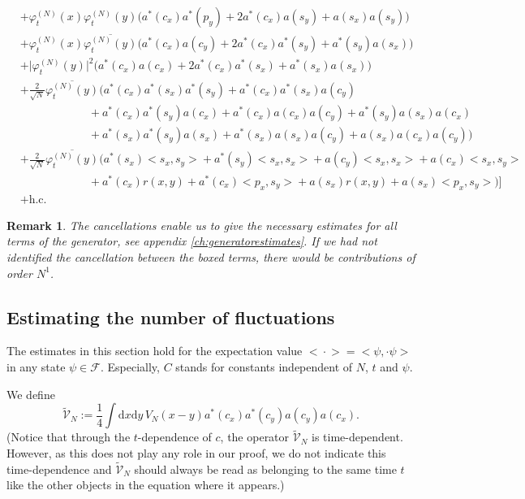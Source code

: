 \documentclass[11pt,a4paper,draft,DIV11]{scrartcl}	%
\newtheorem*{rem}{Remark}
\newcommand{\fock}{\mathcal{F}}		%
\newcommand{\di}{\textrm{d}}		%
\newcommand{\tilV}{\tilde{\mathcal{V}}_N}		%
\newcommand{\hc}{\mbox{h.c.}}		%
\newcommand{\scal}[2]{\big<#1,#2\big>} %
\newcommand{\cc}[1]{\overline{#1}}	%
\newcommand{\ev}[1]{\big<#1\big>}	%
\newcommand{\ph}{\varphi_t^{(N)}}	%
\newcommand{\bd}{\begin{displaymath}}			%
\newcommand{\ed}{\end{displaymath}}
\begin{document}
\begin{align}
& + \ph(x)\ph(y) \Big( a^*(c_x) a^*(p_y) + 2 a^*(c_x) a(s_y) +a(s_x) a(s_y) \Big) \label{l18}\\
& + \ph(x) \cc{\ph(y)} \Big( a^*(c_x) a(c_y) + 2 a^*(c_x) a^*(s_y) + a^*(s_y) a(s_x) \Big) \label{l19}\\
& + \lvert \ph(y) \rvert^2 \Big( a^*(c_x) a(c_x) + 2 a^*(c_x) a^*(s_x) + a^*(s_x) a(s_x) \Big) \label{l20}\\
& + \frac{2}{\sqrt{N}}\cc{\ph(y)} \bigg(    a^*(c_x) a^*(s_x) a^*(s_y) + a^*(c_x) a^*(s_x) a(c_y) \label{l21}\\
					    & \qquad\qquad\qquad + a^*(c_x) a^*(s_y) a(c_x) + a^*(c_x) a(c_x) a(c_y) + a^*(s_y) a(s_x) a(c_x) \label{l22}\\
					    & \qquad\qquad\qquad + a^*(s_x) a^*(s_y) a(s_x) + a^*(s_x) a(s_x) a(c_y) + a(s_x) a(c_x) a(c_y)  \bigg) \label{l23}\\
& + \frac{2}{\sqrt{N}}\cc{\ph(y)} \bigg(    a^*(s_x) \scal{s_x}{s_y} + a^*(s_y) \scal{s_x}{s_x}  + a(c_y) \scal{s_x}{s_x} + 							a(c_x) \scal{s_x}{s_y} \label{l24}\\
					    & \qquad\qquad\qquad + a^*(c_x)r(x,y) + a^*(c_x)\scal{p_x}{s_y} + a(s_x)r(x,y) + 			a(s_x)\scal{p_x}{s_y}		\bigg)    \Big] \label{l25}\\
&+ \hc \nonumber
\end{align}

\begin{rem}The cancellations enable us to give the necessary estimates for all terms of the generator, see appendix \ref{ch:generatorestimates}. If we had not identified the cancellation between the boxed terms, there would be contributions of order $N^1$.
\end{rem}


\subsection{Estimating the number of fluctuations}
The estimates in this section hold for the expectation value $\ev{\cdot} = \scal{\psi}{\cdot\psi}$ in any state $\psi \in \fock$. Especially, $C$ stands for constants independent of $N$, $t$ and $\psi$.

We define
\bd
\tilV := \frac{1}{4} \int \di x\di y\, V_N(x-y) a^\ast(c_x) a^\ast(c_y)a(c_y)a(c_x).
\ed
(Notice that through the $t$-dependence of $c$, the operator $\tilV$ is time-dependent. However, as this does not play any role in our proof, we do not indicate this time-dependence and $\tilV$ should always be read as belonging to the same time $t$ like the other objects in the equation where it appears.)
\end{document}

